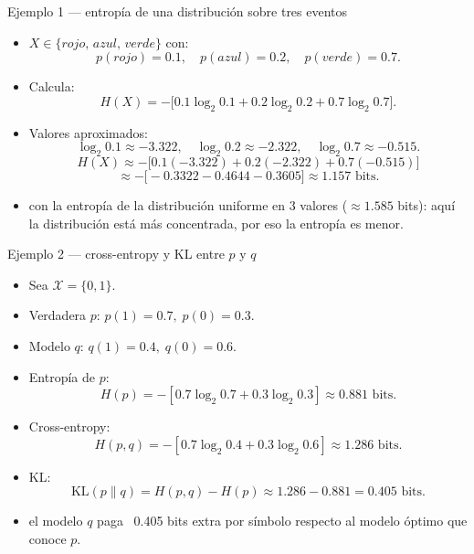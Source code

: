 \begin{frame}{Ejemplo 1 — entropía de una distribución sobre tres eventos}
\begin{itemize}
  \item \(X\in\{rojo,\,azul,\,verde\}\) con:
  \[
    p(rojo)=0.1,\quad p(azul)=0.2,\quad p(verde)=0.7.
  \]
  \item Calcula:
  \[
    H(X) = -\big[0.1\log_2 0.1 + 0.2\log_2 0.2 + 0.7\log_2 0.7\big].
  \]
  \item Valores aproximados:
  \[
    \log_2 0.1\approx -3.322,\quad
    \log_2 0.2\approx -2.322,\quad
    \log_2 0.7\approx -0.515.
  \]
  \[
    H(X)\approx -\big[0.1(-3.322)+0.2(-2.322)+0.7(-0.515)\big]
  \]
  \[
    \approx -\big[-0.3322-0.4644-0.3605\big]
    \approx 1.157 \text{ bits.}
  \]
  \item {} con la entropía de la distribución uniforme en 3 valores (\(\approx 1.585\) bits): aquí la distribución está más concentrada, por eso la entropía es menor.
\end{itemize}
\end{frame}

\begin{frame}{Ejemplo 2 — cross-entropy y KL entre \(p\) y \(q\)}
\begin{itemize}
  \item Sea \(\mathcal{X}=\{0,1\}\).
  \item Verdadera \(p\): \quad \(p(1)=0.7,\;p(0)=0.3.\)
  \item Modelo \(q\): \quad \(q(1)=0.4,\;q(0)=0.6.\)
  \item Entropía de \(p\):
  \[
    H(p) = -[0.7\log_2 0.7 + 0.3\log_2 0.3]\approx 0.881 \text{ bits.}
  \]
  \item Cross-entropy:
  \[
    H(p,q) = -[0.7\log_2 0.4 + 0.3\log_2 0.6]\approx 1.286 \text{ bits.}
  \]
  \item KL:
  \[
    \mathrm{KL}(p\|q) = H(p,q) - H(p)\approx 1.286 - 0.881 = 0.405 \text{ bits.}
  \]
  \item {} el modelo \(q\) paga ~0.405 bits extra por símbolo respecto al modelo óptimo que conoce \(p\).
\end{itemize}
\end{frame}

